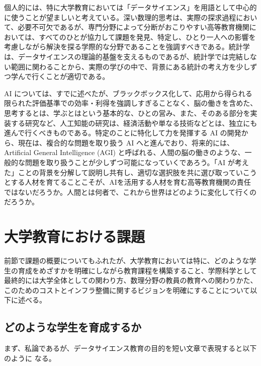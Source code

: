 \documentclass[
]{book}
\theoremstyle{definition}
\theoremstyle{definition}
\theoremstyle{definition}
\theoremstyle{definition}
\theoremstyle{remark}
\begin{document}
個人的には、特に大学教育においては「データサイエンス」を用語として中心的に使うことが望ましいと考えている。深い数理的思考は、実際の探求過程において、必要不可欠であるが、専門分野によって分断がおこりやすい高等教育機関においては、すべてのひとが協力して課題を発見、特定し、ひとり一人への影響を考慮しながら解決を探る学際的な分野であることを強調すべきである。統計学は、データサイエンスの理論的基盤を支えるものであるが、統計学では完結しない範囲に関わることから、実際の学びの中で、背景にある統計の考え方を少しずつ学んで行くことが適切である。

AI については、すでに述べたが、ブラックボックス化して、応用から得られる限られた評価基準での効率・利得を強調しすぎることなく、脳の働きを含めた、思考するとは、学ぶとはという基本的な、ひとの営み、また、そのある部分を実装する研究など、人工知能の研究は、経済活動や単なる技術などとは、独立にも進んで行くべきものである。特定のことに特化して力を発揮する AI の開発から、現在は、複合的な問題を取り扱う AI へと進んでおり、将来的には、Artificial General Intelligence (AGI) と呼ばれる、人間の脳の働きのような、一般的な問題を取り扱うことが少しずつ可能になっていくであろう。「AI が考えた」ことの背景を分解して説明し共有し、適切な選択肢を共に選び取っていこうとする人材を育てることこそが、AIを活用する人材を育む高等教育機関の責任ではないだろうか。人間とは何者で、これから世界はどのように変化して行くのだろうか。

\hypertarget{ux5927ux5b66ux6559ux80b2ux306bux304aux3051ux308bux8ab2ux984c}{%
\section{大学教育における課題}\label{ux5927ux5b66ux6559ux80b2ux306bux304aux3051ux308bux8ab2ux984c}}

前節で課題の概要についてもふれたが、大学教育においては特に、どのような学生の育成をめざすかを明確にしながら教育課程を構築すること、学際科学として最終的には大学全体としての関わり方、数理分野の教員の教育への関わりかた、このためのコストとインフラ整備に関するビジョンを明確にすることについて以下に述べる。

\hypertarget{ux3069ux306eux3088ux3046ux306aux5b66ux751fux3092ux80b2ux6210ux3059ux308bux304b}{%
\subsection{どのような学生を育成するか}\label{ux3069ux306eux3088ux3046ux306aux5b66ux751fux3092ux80b2ux6210ux3059ux308bux304b}}

まず、私論であるが、データサイエンス教育の目的を短い文章で表現すると以下のように
なる。
\end{document}
